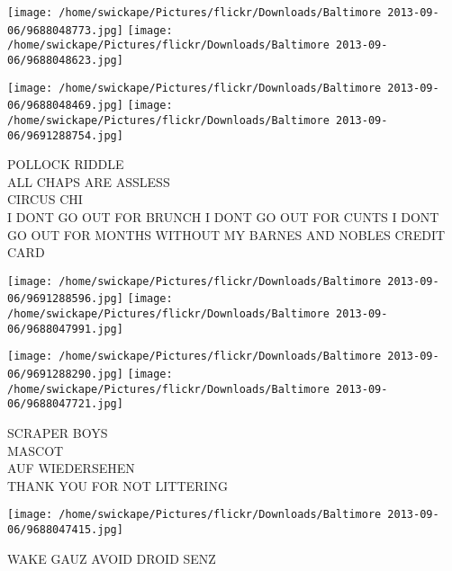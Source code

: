 \documentclass[10pt,letterpaper]{article}
\begin{document}
\texttt{[image: /home/swickape/Pictures/flickr/Downloads/Baltimore 2013-09-06/9688048773.jpg]}
\texttt{[image: /home/swickape/Pictures/flickr/Downloads/Baltimore 2013-09-06/9688048623.jpg]}

\texttt{[image: /home/swickape/Pictures/flickr/Downloads/Baltimore 2013-09-06/9688048469.jpg]}
\texttt{[image: /home/swickape/Pictures/flickr/Downloads/Baltimore 2013-09-06/9691288754.jpg]}

POLLOCK RIDDLE\\
ALL CHAPS ARE ASSLESS\\
CIRCUS CHI\\
I DONT GO OUT FOR BRUNCH I DONT GO OUT FOR CUNTS I DONT GO OUT FOR MONTHS WITHOUT MY BARNES AND NOBLES CREDIT CARD
\pagebreak

\texttt{[image: /home/swickape/Pictures/flickr/Downloads/Baltimore 2013-09-06/9691288596.jpg]}
\texttt{[image: /home/swickape/Pictures/flickr/Downloads/Baltimore 2013-09-06/9688047991.jpg]}

\texttt{[image: /home/swickape/Pictures/flickr/Downloads/Baltimore 2013-09-06/9691288290.jpg]}
\texttt{[image: /home/swickape/Pictures/flickr/Downloads/Baltimore 2013-09-06/9688047721.jpg]}

SCRAPER BOYS\\
MASCOT\\
AUF WIEDERSEHEN\\
THANK YOU FOR NOT LITTERING
\pagebreak

\texttt{[image: /home/swickape/Pictures/flickr/Downloads/Baltimore 2013-09-06/9688047415.jpg]}

WAKE GAUZ AVOID DROID SENZ
\pagebreak
\end{document}
